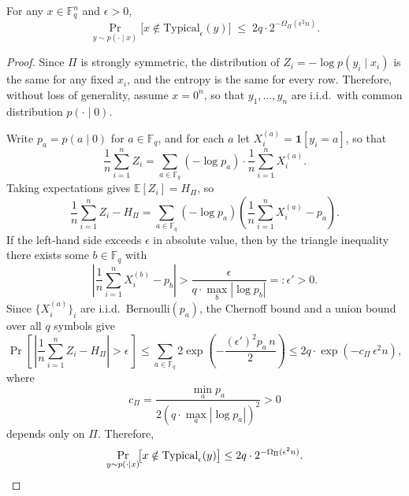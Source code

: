 \documentclass[10pt,a4paper]{amsart}
\newcommand{\typical}{\mathrm{Typical}}
\begin{document}
\begin{lemma}
\label{lem:typical_prob}
For any $x \in \mathbb{F}_q^n$ and $\epsilon > 0$,
\[
\Pr_{y \sim p(\cdot \mid x)}\!\bigl[x \notin \typical_\epsilon(y)\bigr] \;\le\; 2q\cdot 2^{-\Omega_\Pi(\epsilon^2 n)}.
\]
\end{lemma}

\begin{proof}
Since $\Pi$ is strongly symmetric, the distribution of $Z_i = -\log p(y_i \mid x_i)$
is the same for any fixed $x_i$, and the entropy is the same for every
row. Therefore, without loss of generality, assume $x = 0^n$, so that
$y_1, \ldots, y_n$ are i.i.d.\ with common distribution $p(\cdot \mid 0)$.

Write $p_a = p(a \mid 0)$ for $a \in \mathbb{F}_q$, and for each $a$ let
$X_i^{(a)} = \mathbf{1}[y_i = a]$, so that
\[
\frac{1}{n}\sum_{i=1}^n Z_i
= \sum_{a \in \mathbb{F}_q} (-\log p_a)\cdot \frac{1}{n}\sum_{i=1}^n X_i^{(a)}.
\]
Taking expectations gives $\mathbb{E}[Z_i] = H_\Pi$, so
\[
\frac{1}{n}\sum_{i=1}^n Z_i - H_\Pi
= \sum_{a \in \mathbb{F}_q}(-\log p_a)
  \left(\frac{1}{n}\sum_{i=1}^n X_i^{(a)} - p_a\right).
\]
If the left-hand side exceeds $\epsilon$ in absolute value, then by the triangle
inequality there exists some $b \in \mathbb{F}_q$ with
\[
\left|\frac{1}{n}\sum_{i=1}^n X_i^{(b)} - p_{b}\right|
> \frac{\epsilon}{q \cdot \max_b |\log p_b|} =: \epsilon' > 0.
\]
Since $\{X_i^{(a)}\}_i$ are i.i.d.\ Bernoulli$(p_a)$, the Chernoff bound and a
union bound over all $q$ symbols give
\[
\Pr\!\left[\,\left|\frac{1}{n}\sum_{i=1}^n Z_i - H_\Pi\right| > \epsilon\,\right]
\leq \sum_{a \in \mathbb{F}_q} 2\exp\!\left(-\frac{(\epsilon')^2 p_a\, n}{2}\right)
\leq 2q \cdot \exp(-c_\Pi\,\epsilon^2 n),
\]
where 
\[
c_\Pi = \frac{\min_a p_a}{2(q \cdot \max_a |\log p_a|)^2} > 0
\]
depends only on $\Pi$. Therefore,
\[
\Pr_{y \sim p(\cdot \mid x)}\!\bigl[x \notin \mathrm{Typical}_\epsilon(y)\bigr]
\leq 2q \cdot 2^{-\Omega_\Pi(\epsilon^2 n)}.
\qedhere
\]
\end{proof}
\end{document}
